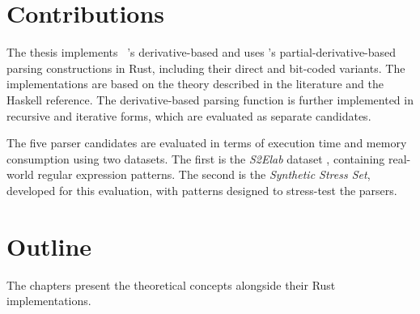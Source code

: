 %
%
%

\section{Contributions}
\label{sec:contributions}

The thesis implements ~\citep{sulzmannlu2014}'s derivative-based 
and uses \citep{sulzmannlu2012}'s partial-derivative-based 
parsing constructions in Rust, including their direct and bit-coded variants.
The implementations are based on the theory described in the
literature and the Haskell reference.
The derivative-based parsing function is further
implemented in recursive and iterative forms, 
which are evaluated as separate candidates.

The five parser candidates are evaluated 
in terms of execution time and memory consumption using two datasets. 
The first is the \emph{S2Elab} dataset \citep{s2elab-regexeval-dataset}, 
containing real-world regular expression patterns. 
The second is the \emph{Synthetic Stress Set}, 
developed for this evaluation,
with patterns designed to stress-test the parsers.

%
%
%

\section{Outline}
\label{sec:thesis-outline}

The chapters present the theoretical concepts alongside their Rust implementations.

